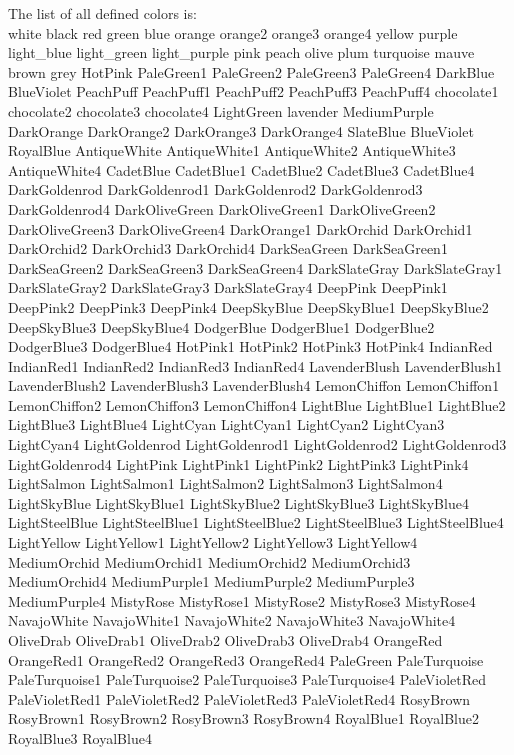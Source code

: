 %
%

The list of all defined colors is:\\ 
white
black
red
green
blue
orange
orange2
orange3
orange4
yellow
purple
light\_blue
light\_green
light\_purple
pink
peach
olive
plum
turquoise
mauve
brown
grey
HotPink
PaleGreen1
PaleGreen2
PaleGreen3
PaleGreen4
DarkBlue
BlueViolet
PeachPuff
PeachPuff1
PeachPuff2
PeachPuff3
PeachPuff4
chocolate1
chocolate2
chocolate3
chocolate4
LightGreen
lavender
MediumPurple
DarkOrange
DarkOrange2
DarkOrange3
DarkOrange4
SlateBlue
BlueViolet
RoyalBlue
AntiqueWhite
AntiqueWhite1
AntiqueWhite2
AntiqueWhite3
AntiqueWhite4
CadetBlue
CadetBlue1
CadetBlue2
CadetBlue3
CadetBlue4
DarkGoldenrod
DarkGoldenrod1
DarkGoldenrod2
DarkGoldenrod3
DarkGoldenrod4
DarkOliveGreen
DarkOliveGreen1
DarkOliveGreen2
DarkOliveGreen3
DarkOliveGreen4
DarkOrange1
DarkOrchid
DarkOrchid1
DarkOrchid2
DarkOrchid3
DarkOrchid4
DarkSeaGreen
DarkSeaGreen1
DarkSeaGreen2
DarkSeaGreen3
DarkSeaGreen4
DarkSlateGray
DarkSlateGray1
DarkSlateGray2
DarkSlateGray3
DarkSlateGray4
DeepPink
DeepPink1
DeepPink2
DeepPink3
DeepPink4
DeepSkyBlue
DeepSkyBlue1
DeepSkyBlue2
DeepSkyBlue3
DeepSkyBlue4
DodgerBlue
DodgerBlue1
DodgerBlue2
DodgerBlue3
DodgerBlue4
HotPink1
HotPink2
HotPink3
HotPink4
IndianRed
IndianRed1
IndianRed2
IndianRed3
IndianRed4
LavenderBlush
LavenderBlush1
LavenderBlush2
LavenderBlush3
LavenderBlush4
LemonChiffon
LemonChiffon1
LemonChiffon2
LemonChiffon3
LemonChiffon4
LightBlue
LightBlue1
LightBlue2
LightBlue3
LightBlue4
LightCyan
LightCyan1
LightCyan2
LightCyan3
LightCyan4
LightGoldenrod
LightGoldenrod1
LightGoldenrod2
LightGoldenrod3
LightGoldenrod4
LightPink
LightPink1
LightPink2
LightPink3
LightPink4
LightSalmon
LightSalmon1
LightSalmon2
LightSalmon3
LightSalmon4
LightSkyBlue
LightSkyBlue1
LightSkyBlue2
LightSkyBlue3
LightSkyBlue4
LightSteelBlue
LightSteelBlue1
LightSteelBlue2
LightSteelBlue3
LightSteelBlue4
LightYellow
LightYellow1
LightYellow2
LightYellow3
LightYellow4
MediumOrchid
MediumOrchid1
MediumOrchid2
MediumOrchid3
MediumOrchid4
MediumPurple1
MediumPurple2
MediumPurple3
MediumPurple4
MistyRose
MistyRose1
MistyRose2
MistyRose3
MistyRose4
NavajoWhite
NavajoWhite1
NavajoWhite2
NavajoWhite3
NavajoWhite4
OliveDrab
OliveDrab1
OliveDrab2
OliveDrab3
OliveDrab4
OrangeRed
OrangeRed1
OrangeRed2
OrangeRed3
OrangeRed4
PaleGreen
PaleTurquoise
PaleTurquoise1
PaleTurquoise2
PaleTurquoise3
PaleTurquoise4
PaleVioletRed
PaleVioletRed1
PaleVioletRed2
PaleVioletRed3
PaleVioletRed4
RosyBrown
RosyBrown1
RosyBrown2
RosyBrown3
RosyBrown4
RoyalBlue1
RoyalBlue2
RoyalBlue3
RoyalBlue4
